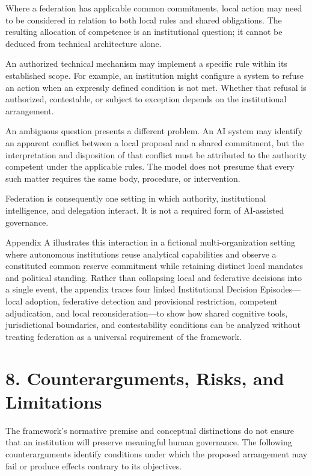 \documentclass[
  10pt,
]{article}
\begin{document}
Where a federation has applicable common commitments, local action may
need to be considered in relation to both local rules and shared
obligations. The resulting allocation of competence is an institutional
question; it cannot be deduced from technical architecture alone.

An authorized technical mechanism may implement a specific rule within
its established scope. For example, an institution might configure a
system to refuse an action when an expressly defined condition is not
met. Whether that refusal is authorized, contestable, or subject to
exception depends on the institutional arrangement.

An ambiguous question presents a different problem. An AI system may
identify an apparent conflict between a local proposal and a shared
commitment, but the interpretation and disposition of that conflict must
be attributed to the authority competent under the applicable rules. The
model does not presume that every such matter requires the same body,
procedure, or intervention.

Federation is consequently one setting in which authority, institutional
intelligence, and delegation interact. It is not a required form of
AI-assisted governance.

Appendix A illustrates this interaction in a fictional
multi-organization setting where autonomous institutions reuse
analytical capabilities and observe a constituted common reserve
commitment while retaining distinct local mandates and political
standing. Rather than collapsing local and federative decisions into a
single event, the appendix traces four linked Institutional Decision
Episodes---local adoption, federative detection and provisional
restriction, competent adjudication, and local reconsideration---to show
how shared cognitive tools, jurisdictional boundaries, and
contestability conditions can be analyzed without treating federation as
a universal requirement of the framework.

\section{8. Counterarguments, Risks, and
Limitations}\label{counterarguments-risks-and-limitations}

The framework's normative premise and conceptual distinctions do not
ensure that an institution will preserve meaningful human governance.
The following counterarguments identify conditions under which the
proposed arrangement may fail or produce effects contrary to its
objectives.
\end{document}
